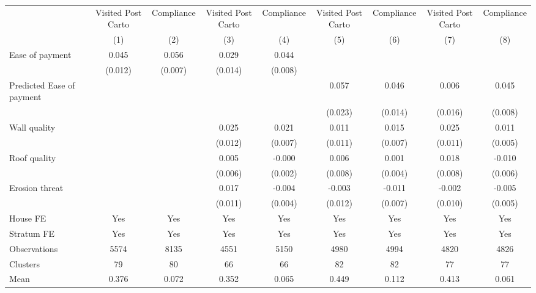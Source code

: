 \begin{tabular}{l*{8}{c}}
\toprule
                &\multicolumn{1}{c}{Visited Post Carto}&\multicolumn{1}{c}{Compliance}&\multicolumn{1}{c}{Visited Post Carto}&\multicolumn{1}{c}{Compliance}&\multicolumn{1}{c}{Visited Post Carto}&\multicolumn{1}{c}{Compliance}&\multicolumn{1}{c}{Visited Post Carto}&\multicolumn{1}{c}{Compliance}\\
                &\multicolumn{1}{c}{(1)}&\multicolumn{1}{c}{(2)}&\multicolumn{1}{c}{(3)}&\multicolumn{1}{c}{(4)}&\multicolumn{1}{c}{(5)}&\multicolumn{1}{c}{(6)}&\multicolumn{1}{c}{(7)}&\multicolumn{1}{c}{(8)}\\
\midrule
Ease of payment &    0.045&    0.056&    0.029&    0.044&         &         &         &         \\
                &  (0.012)&  (0.007)&  (0.014)&  (0.008)&         &         &         &         \\
Predicted Ease of payment&         &         &         &         &    0.057&    0.046&    0.006&    0.045\\
                &         &         &         &         &  (0.023)&  (0.014)&  (0.016)&  (0.008)\\
Wall quality    &         &         &    0.025&    0.021&    0.011&    0.015&    0.025&    0.011\\
                &         &         &  (0.012)&  (0.007)&  (0.011)&  (0.007)&  (0.011)&  (0.005)\\
Roof quality    &         &         &    0.005&   -0.000&    0.006&    0.001&    0.018&   -0.010\\
                &         &         &  (0.006)&  (0.002)&  (0.008)&  (0.004)&  (0.008)&  (0.006)\\
Erosion threat  &         &         &    0.017&   -0.004&   -0.003&   -0.011&   -0.002&   -0.005\\
                &         &         &  (0.011)&  (0.004)&  (0.012)&  (0.007)&  (0.010)&  (0.005)\\
House FE        &      Yes&      Yes&      Yes&      Yes&      Yes&      Yes&      Yes&      Yes\\
Stratum FE      &      Yes&      Yes&      Yes&      Yes&      Yes&      Yes&      Yes&      Yes\\
\midrule
Observations    &     5574&     8135&     4551&     5150&     4980&     4994&     4820&     4826\\
Clusters        &       79&       80&       66&       66&       82&       82&       77&       77\\
Mean            &    0.376&    0.072&    0.352&    0.065&    0.449&    0.112&    0.413&    0.061\\
\bottomrule
\end{tabular}
